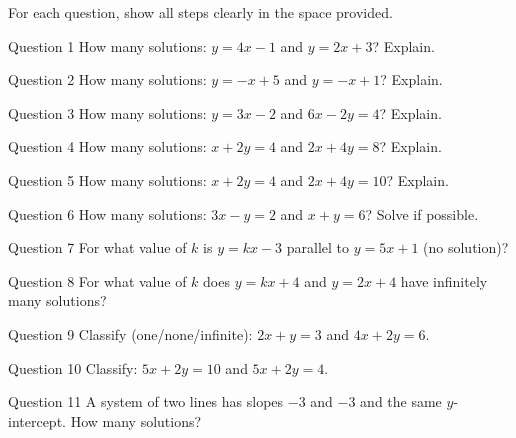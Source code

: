 \documentclass[11pt]{article}
\begin{document}
\clearpage
{}
For each question, show all steps clearly in the space provided.

\begin{qbox}{Question 1}
How many solutions: $y=4x-1$ and $y=2x+3$? Explain.\workspace{2.2cm}
\end{qbox}

\begin{qbox}{Question 2}
How many solutions: $y=-x+5$ and $y=-x+1$? Explain.\workspace{2.2cm}
\end{qbox}

\begin{qbox}{Question 3}
How many solutions: $y=3x-2$ and $6x-2y=4$? Explain.\workspace{2.4cm}
\end{qbox}

\begin{qbox}{Question 4}
How many solutions: $x+2y=4$ and $2x+4y=8$? Explain.\workspace{2.4cm}
\end{qbox}

\begin{qbox}{Question 5}
How many solutions: $x+2y=4$ and $2x+4y=10$? Explain.\workspace{2.4cm}
\end{qbox}

\begin{qbox}{Question 6}
How many solutions: $3x-y=2$ and $x+y=6$? Solve if possible.\workspace{2.6cm}
\end{qbox}

\begin{qbox}{Question 7}
For what value of $k$ is $y=kx-3$ parallel to $y=5x+1$ (no solution)?\workspace{2.2cm}
\end{qbox}

\begin{qbox}{Question 8}
For what value of $k$ does $y=kx+4$ and $y=2x+4$ have infinitely many solutions?\workspace{2.2cm}
\end{qbox}

\begin{qbox}{Question 9}
Classify (one/none/infinite): $2x+y=3$ and $4x+2y=6$.\workspace{2.2cm}
\end{qbox}

\begin{qbox}{Question 10}
Classify: $5x+2y=10$ and $5x+2y=4$.\workspace{2.2cm}
\end{qbox}

\begin{qbox}{Question 11}
A system of two lines has slopes $-3$ and $-3$ and the same $y$-intercept. How many solutions?\workspace{2.2cm}
\end{qbox}
\end{document}
